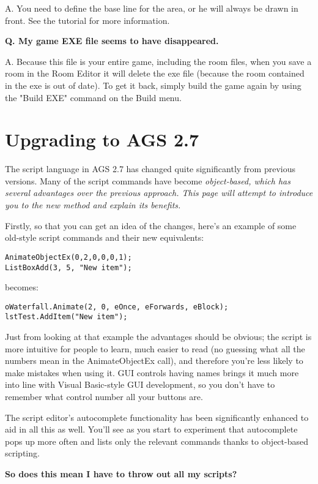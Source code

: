 A. You need to define the base line for the area, or he will always be drawn
   in front. See the tutorial for more information.

\bf{Q. My game EXE file seems to have disappeared.}

A. Because this file is your entire game, including the room files, when you
   save a room in the Room Editor it will delete the exe file (because the
   room contained in the exe is out of date). To get it back, simply build the
   game again by using the "Build EXE" command on the Build menu.



\chapter{Upgrading to AGS 2.7}\label{UpgradingTo27}%

The script language in AGS 2.7 has changed quite significantly from previous versions.
Many of the script commands have become \it{object-based}, which has several advantages
over the previous approach. This page will attempt to introduce you to the new method and
explain its benefits.

Firstly, so that you can get an idea of the changes, here's an example of some old-style
script commands and their new equivalents:
\begin{verbatim}
AnimateObjectEx(0,2,0,0,0,1);
ListBoxAdd(3, 5, "New item");
\end{verbatim}
becomes:
\begin{verbatim}
oWaterfall.Animate(2, 0, eOnce, eForwards, eBlock);
lstTest.AddItem("New item");
\end{verbatim}

Just from looking at that example the advantages should be obvious; the script is more
intuitive for people to learn, much easier to read (no guessing what all the numbers mean
in the AnimateObjectEx call), and therefore you're less likely to make mistakes when using it.
GUI controls having names brings it much more into line with Visual Basic-style GUI
development, so you don't have to remember what control number all your buttons are.

The script editor's autocomplete functionality has been significantly enhanced to aid
in all this as well. You'll see as you start to experiment that autocomplete pops up more
often and lists only the relevant commands thanks to object-based scripting.

\bf{So does this mean I have to throw out all my scripts?}


